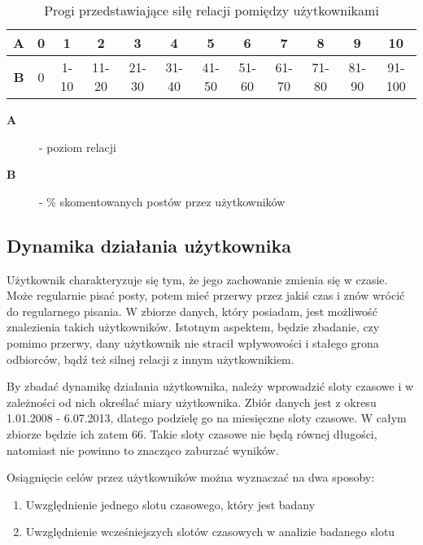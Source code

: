 \documentclass[polish,12pt]{aghthesis}
\begin{document}
\begin{table}[h]
\centering
\begin{tabular}{|c|c|c|c|c|c|c|c|c|c|c|c|}
\hline
\textbf{A} & 0 & 1    & 2     & 3     & 4     & 5     & 6     & 7     & 8     & 9     & 10     \\
\hline
\textbf{B} & 0 & 1-10 & 11-20 & 21-30 & 31-40 & 41-50 & 51-60 & 61-70 & 71-80 & 81-90 & 91-100 \\
\hline
\end{tabular}
\begin{description}
\item[\textbf{A}] - poziom relacji
\item[\textbf{B}] - \% skomentowanych postów przez użytkowników
\end{description}
\caption[Progi siły relacji]{Progi przedstawiające siłę relacji pomiędzy użytkownikami}
\label{tab:tab_relacje}
\end{table}

\FloatBarrier

\subsection{Dynamika działania użytkownika}

Użytkownik charakteryzuje się tym, że jego zachowanie zmienia się w czasie. Może regularnie pisać posty, potem mieć przerwy przez jakiś czas i znów wrócić do regularnego pisania. W zbiorze danych, który posiadam, jest możliwość znalezienia takich użytkowników. Istotnym aspektem, będzie zbadanie, czy pomimo przerwy, dany użytkownik nie stracił wpływowości i stałego grona odbiorców, bądź też silnej relacji z innym użytkownikiem.

By zbadać dynamikę działania użytkownika, należy wprowadzić sloty czasowe i w zależności od nich określać miary użytkownika. Zbiór danych jest z okresu 1.01.2008 - 6.07.2013, dlatego podzielę go na miesięczne sloty czasowe. W całym zbiorze będzie ich zatem 66. Takie sloty czasowe nie będą równej długości, natomiast nie powinno to znacząco zaburzać wyników.

Osiągnięcie celów przez użytkowników można wyznaczać na dwa sposoby:

\begin{enumerate}
    \item Uwzględnienie jednego slotu czasowego, który jest badany
    \item Uwzględnienie wcześniejszych slotów czasowych w analizie badanego slotu
\end{enumerate}{}
\end{document}
